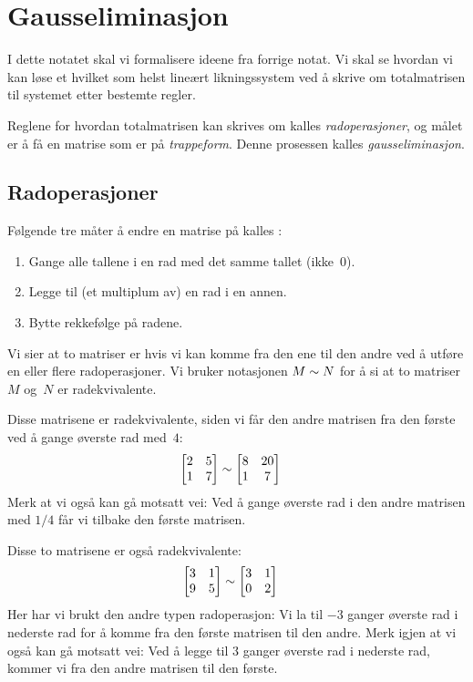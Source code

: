 \chapter{Gausseliminasjon}

I dette notatet skal vi formalisere ideene fra forrige notat.  Vi
skal se hvordan vi kan løse et hvilket som helst lineært
likningssystem ved å skrive om totalmatrisen til systemet etter
bestemte regler.

Reglene for hvordan totalmatrisen kan skrives om kalles
\emph{radoperasjoner}, og målet er å få en matrise som er på
\emph{trappeform}.  Denne prosessen kalles \emph{gausseliminasjon}.


\section*{Radoperasjoner}

Følgende tre måter å endre en matrise på kalles
:
\begin{enumerate}
\item Gange alle tallene i en rad med det samme tallet (ikke~$0$).
\item Legge til (et multiplum av) en rad i en annen.
\item Bytte rekkefølge på radene.
\end{enumerate}

Vi sier at to matriser er  hvis vi kan komme
fra den ene til den andre ved å utføre en eller flere radoperasjoner.
Vi bruker notasjonen $M \sim N$ for å si at to matriser $M$ og~$N$
er radekvivalente.

\begin{ex}
\label{ex:radekvivalent}
Disse matrisene er radekvivalente, siden vi får den andre matrisen fra
den første ved å gange øverste rad med~$4$:
\begin{align*}
\begin{bmatrix}
 2 & 5 \\
 1 & 7
\end{bmatrix}
&\sim
\begin{bmatrix}
 8 & 20 \\
 1 &  7
\end{bmatrix}
\end{align*}
Merk at vi også kan gå motsatt vei: Ved å gange øverste rad i den
andre matrisen med $1/4$ får vi tilbake den første matrisen.

Disse to matrisene er også radekvivalente:
\begin{align*}
\begin{bmatrix}
 3 & 1 \\
 9 & 5
\end{bmatrix}
&\sim
\begin{bmatrix}
 3 & 1 \\
 0 & 2
\end{bmatrix}
\end{align*}
Her har vi brukt den andre typen radoperasjon: Vi la til $-3$ ganger
øverste rad i nederste rad for å komme fra den første matrisen til den
andre.  Merk igjen at vi også kan gå motsatt vei: Ved å legge til $3$
ganger øverste rad i nederste rad, kommer vi fra den andre matrisen
til den første.
\end{ex}

